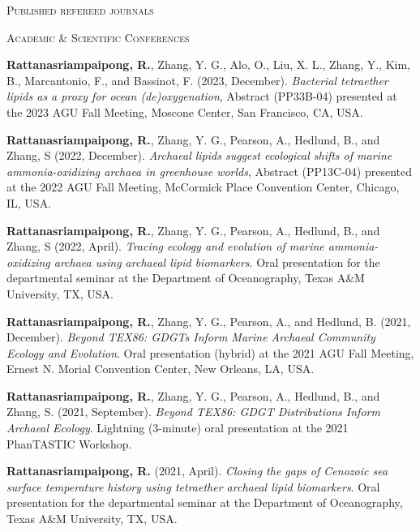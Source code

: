 \documentclass[10pt, letter]{article}
\newcommand{\myname}[1]{\textbf{Rattanasriampaipong, R.}}
\newcommand{\margintext}[1]{\marginnote{\normalsize\textbf #1 |}}
\begin{document}
\bigskip
\textsc{Published refereed journals}
\begin{etaremune}
\item {}
\item {}
\item {}
\end{etaremune}


\bigskip
\margintext{Presentations} 
\textsc{Academic \& Scientific Conferences}
\begin{etaremune}
\item {\myname{rattanasriampaipong}}, Zhang, Y. G., Alo, O., Liu, X. L., Zhang, Y., Kim, B., Marcantonio, F., and Bassinot, F. (2023, December). \textit{Bacterial tetraether lipids as a proxy for ocean (de)oxygenation}, Abstract (PP33B-04) presented at the 2023 AGU Fall Meeting, Moscone Center, San Francisco, CA, USA.

\item {\myname{rattanasriampaipong}}, Zhang, Y. G., Pearson, A., Hedlund, B., and Zhang, S (2022, December). \textit{Archaeal lipids suggest ecological shifts of marine ammonia-oxidizing archaea in greenhouse worlds}, Abstract (PP13C-04) presented at the 2022 AGU Fall Meeting, McCormick Place Convention Center, Chicago, IL, USA.

\item {\myname{rattanasriampaipong}}, Zhang, Y. G., Pearson, A., Hedlund, B., and Zhang, S (2022, April). \textit{Tracing ecology and evolution of marine ammonia-oxidizing archaea using archaeal lipid biomarkers}. Oral presentation for the departmental seminar at the Department of Oceanography, Texas A\&M University, TX, USA.

\item {\myname{rattanasriampaipong}}, Zhang, Y. G., Pearson, A., and Hedlund, B. (2021, December). \textit{Beyond TEX86: GDGTs Inform Marine Archaeal Community Ecology and Evolution}. Oral presentation (hybrid) at the 2021 AGU Fall Meeting, Ernest N. Morial Convention Center, New Orleans, LA, USA.

\item {\myname{rattanasriampaipong}}, Zhang, Y. G., Pearson, A., Hedlund, B., and Zhang, S. (2021, September). \textit{Beyond TEX86: GDGT Distributions Inform Archaeal Ecology}. Lightning (3-minute) oral presentation at the 2021 PhanTASTIC Workshop.

\item {\myname{rattanasriampaipong}} (2021, April). \textit{Closing the gaps of Cenozoic sea surface temperature history using tetraether archaeal lipid biomarkers}. Oral presentation for the departmental seminar at the Department of Oceanography, Texas A\&M University, TX, USA.


\end{etaremune}
\end{document}
